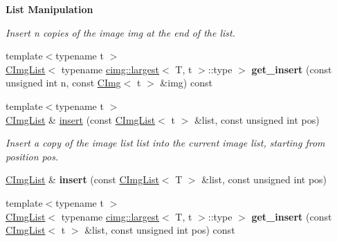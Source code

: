 \begin{Indent}{\bf List Manipulation}
\begin{DoxyCompactItemize}
\begin{DoxyCompactList}\small\item\em Insert n copies of the image {\ttfamily img} at the end of the list. \item\end{DoxyCompactList}\item 
\hypertarget{structcimg__library_1_1_c_img_list_a1ad911fe949537f6c6714e93c1552e42}{
{\footnotesize template$<$typename t $>$ }\\\hyperlink{structcimg__library_1_1_c_img_list}{CImgList}$<$ typename \hyperlink{structcimg__library_1_1cimg_1_1largest}{cimg::largest}$<$ T, t $>$::type $>$ {\bfseries get\_\-insert} (const unsigned int n, const \hyperlink{structcimg__library_1_1_c_img}{CImg}$<$ t $>$ \&img) const }
\label{structcimg__library_1_1_c_img_list_a1ad911fe949537f6c6714e93c1552e42}

\item 
\hypertarget{structcimg__library_1_1_c_img_list_a0dfc3639eeb9283293dbf49fb5df9fd8}{
{\footnotesize template$<$typename t $>$ }\\\hyperlink{structcimg__library_1_1_c_img_list}{CImgList} \& \hyperlink{structcimg__library_1_1_c_img_list_a0dfc3639eeb9283293dbf49fb5df9fd8}{insert} (const \hyperlink{structcimg__library_1_1_c_img_list}{CImgList}$<$ t $>$ \&list, const unsigned int pos)}
\label{structcimg__library_1_1_c_img_list_a0dfc3639eeb9283293dbf49fb5df9fd8}

\begin{DoxyCompactList}\small\item\em Insert a copy of the image list {\ttfamily list} into the current image list, starting from position {\ttfamily pos}. \item\end{DoxyCompactList}\item 
\hypertarget{structcimg__library_1_1_c_img_list_a12bcee1f9ea6a64b9183e0fd2f0dc666}{
\hyperlink{structcimg__library_1_1_c_img_list}{CImgList} \& {\bfseries insert} (const \hyperlink{structcimg__library_1_1_c_img_list}{CImgList}$<$ T $>$ \&list, const unsigned int pos)}
\label{structcimg__library_1_1_c_img_list_a12bcee1f9ea6a64b9183e0fd2f0dc666}

\item 
\hypertarget{structcimg__library_1_1_c_img_list_a29b4261e852eb93a23459377c34d5230}{
{\footnotesize template$<$typename t $>$ }\\\hyperlink{structcimg__library_1_1_c_img_list}{CImgList}$<$ typename \hyperlink{structcimg__library_1_1cimg_1_1largest}{cimg::largest}$<$ T, t $>$::type $>$ {\bfseries get\_\-insert} (const \hyperlink{structcimg__library_1_1_c_img_list}{CImgList}$<$ t $>$ \&list, const unsigned int pos) const }
\label{structcimg__library_1_1_c_img_list_a29b4261e852eb93a23459377c34d5230}


\end{DoxyCompactItemize}
\end{Indent}
